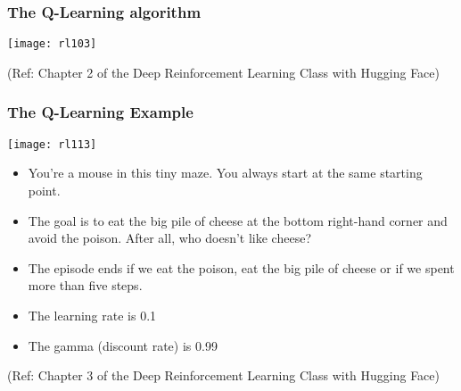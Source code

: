 \begin{frame}[fragile]\frametitle{The Q-Learning algorithm}


\begin{center}
\texttt{[image: rl103]}
\end{center}

{\tiny (Ref: Chapter 2 of the Deep Reinforcement Learning Class with Hugging Face)}

\end{frame}

\begin{frame}[fragile]\frametitle{The Q-Learning Example}


\begin{center}
\texttt{[image: rl113]}
\end{center}

\begin{itemize}
\item You're a mouse in this tiny maze. You always start at the same starting point.
\item The goal is to eat the big pile of cheese at the bottom right-hand corner and avoid the poison. After all, who doesn't like cheese?
\item The episode ends if we eat the poison, eat the big pile of cheese or if we spent more than five steps.
\item The learning rate is 0.1
\item The gamma (discount rate) is 0.99
\end{itemize}

{\tiny (Ref: Chapter 3 of the Deep Reinforcement Learning Class with Hugging Face)}

\end{frame}

